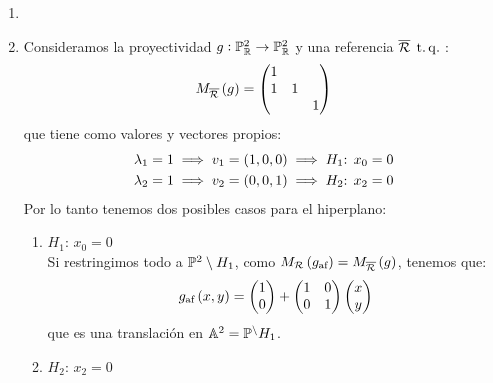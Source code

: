     \begin{example}
        \begin{enumerate}
            \item[]
            \item Consideramos la proyectividad $g:\mathbb{P}^2_{\mathbb{R}} \to \mathbb{P}^2_{\mathbb{R}}$ y una referencia $\overline{\mathcal{R}} \operatorname{\;t.q.\;}$: \\
            \[M_{\overline{\mathcal{R}}}\left( g\right)=
            \begin{pmatrix}
                1 & & \\
                1 & 1 & \\
                 & & 1 \\
            \end{pmatrix}\]
            que tiene como valores y vectores propios:
            \begin{gather*}
                \lambda_1 = 1 \implies v_1 = \left( 1,0,0 \right) \implies H_1\text{: }x_0=0\\
                \lambda_2 = 1 \implies v_2 = \left( 0,0,1 \right) \implies H_2\text{: }x_2=0
            \end{gather*}
            Por lo tanto tenemos dos posibles casos para el hiperplano:
            \begin{enumerate}
                \item $H_1$: $x_0=0$\\
                    Si restringimos todo a $\mathbb{P}^2 \setminus H_1$, como $M_{\mathcal{R}} \left( g_{\text{af}} \right) = M_{\overline{\mathcal{R}}} \left( g \right)$, tenemos que:
                    \[
                    g_\text{af}\left( x,y\right) = 
                    \begin{pmatrix}
                    1\\
                    0\\
                    \end{pmatrix} +
                    \begin{pmatrix}
                    1 & 0\\
                    0 & 1\\
                    \end{pmatrix}
                    \begin{pmatrix}
                    x\\
                    y\\
                    \end{pmatrix}
                    \]
                    que es una translación en $\mathbb{A}^2=\mathbb{P}^\setminus H_1$.
                \item $H_2$: $x_2=0$\\

\end{enumerate}
\end{enumerate}
\end{example}
